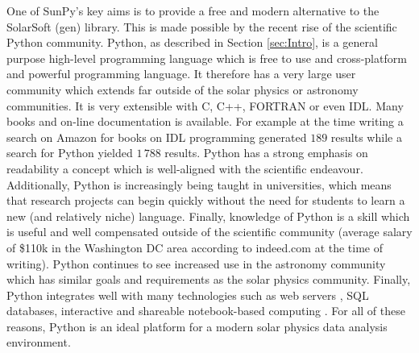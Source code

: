 One of SunPy's key aims is to provide a free and modern alternative to the 
SolarSoft (gen) library. This is made possible by the recent rise of the 
scientific Python community. Python, as described in Section \ref{sec:Intro}, 
is a general purpose high-level programming language which is free to use and 
cross-platform and powerful programming language.
It therefore has a very large user community which extends far outside of the 
solar physics or astronomy communities. It is very extensible with C, C++, 
FORTRAN or even IDL. Many books and on-line documentation is available. For 
example at the time writing a search 
%
% 
on Amazon for books on IDL programming generated $189$ results while a search 
for Python yielded $1\,788$ results. Python has a strong emphasis on 
readability a concept which is well-aligned with the scientific endeavour.
Additionally, Python is increasingly being taught in universities, which means 
that research projects can begin quickly without the need for students to learn 
a new (and relatively niche) language. Finally, knowledge of Python is a skill 
which is useful and well compensated outside of the scientific community 
(average salary of \$110k in the Washington DC area according to indeed.com at 
the time of writing). Python continues to see increased use in the astronomy 
community \citep{greenfield2011} which has similar goals and requirements as 
the solar physics community. Finally, Python integrates well with many 
technologies such as web servers \citep{dolgert2008}, SQL databases, 
interactive and shareable notebook-based computing \citep{perez2007}. For all 
of these reasons, Python is an ideal platform for a modern solar physics data 
analysis environment.

